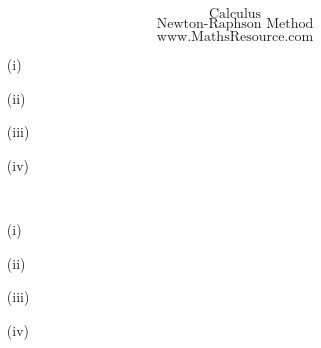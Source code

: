 \documentclass{beamer}
\begin{document}
\begin{frame}


{
\huge
\[ \mbox{Calculus} \]
\[ \mbox{Newton-Raphson Method} \]
}
{
\Large
\[ \mbox{www.MathsResource.com} \]
}
\end{frame}%



\begin{itemize}

\item[(i)]

\item[(ii)]

\item[(iii)]

\item[(iv)]

\end{itemize}

\begin{framed}
\begin{verbatim}


\end{verbatim}
\end{framed}
\newpage
\begin{itemize}

\item[(i)]

\item[(ii)]

\item[(iii)]

\item[(iv)]

\end{itemize}

\begin{framed}
\begin{verbatim}

\end{verbatim}
\end{framed}
\end{document}

